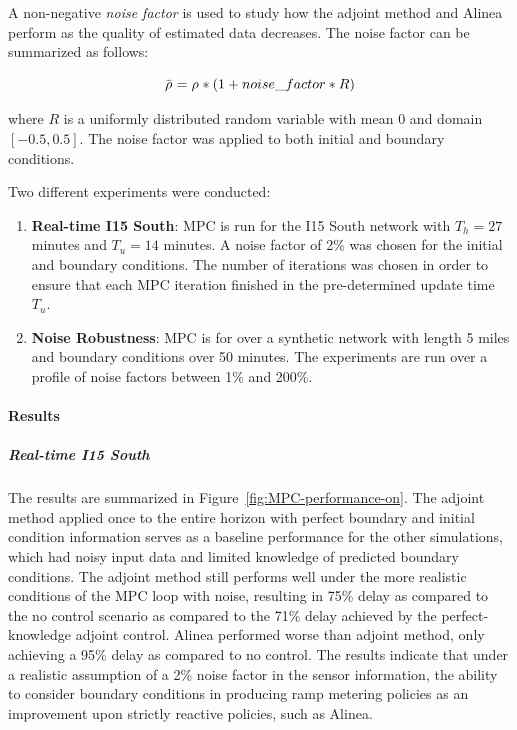 								A non-negative\emph{ noise factor} is used to study how the adjoint
								method and Alinea perform as the quality of estimated data decreases.
								The noise factor can be summarized as follows:
								
								\[
									\bar{\rho_{}^{}}=\rho_{}^{}*(1+noise\_factor*R)
								\]
								
								
								where $R$ is a uniformly distributed random variable with mean $0$
								and domain $\left[-0.5,0.5\right]$. The noise factor was applied
								to both initial and boundary conditions.
								
								Two different experiments were conducted:
								\begin{enumerate}
									\item \textbf{Real-time I15 South}: MPC is run for the I15 South network
									with $T_{h}=27$ minutes and $T_{u}=14$ minutes. A noise factor of
									2\% was chosen for the initial and boundary conditions. The number
									of iterations was chosen in order to ensure that each MPC iteration
									finished in the pre-determined update time $T_{u}$.
									\item \textbf{Noise Robustness}: MPC is for over a synthetic network with
									length 5 miles and boundary conditions over 50 minutes. The experiments
									are run over a profile of noise factors between 1\% and 200\%.
								\end{enumerate}
								
								\paragraph{Results}
								
								
								\subparagraph{Real-time I15 South}
								
								The results are summarized in Figure~\ref{fig:MPC-performance-on}.
								The adjoint method applied once to the entire horizon with perfect
								boundary and initial condition information serves as a baseline performance
								for the other simulations, which had noisy input data and limited
								knowledge of predicted boundary conditions. The adjoint method still
								performs well under the more realistic conditions of the MPC loop
								with noise, resulting in 75\% delay as compared to the no control
								scenario as compared to the 71\% delay achieved by the perfect-knowledge
								adjoint control. Alinea performed worse than adjoint method, only
								achieving a 95\% delay as compared to no control. The results indicate
								that under a realistic assumption of a 2\% noise factor in the sensor
								information, the ability to consider boundary conditions in producing
								ramp metering policies as an improvement upon strictly reactive policies,
								such as Alinea.
								
